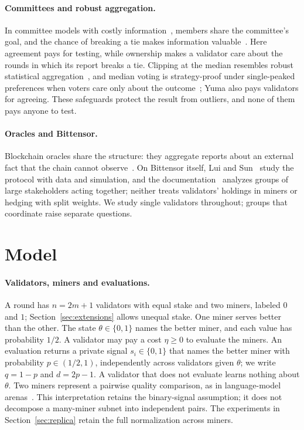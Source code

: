 \documentclass[sigconf,anonymous,review]{acmart}
\numberwithin{equation}{section}
\begin{document}
\paragraph{Committees and robust aggregation.} In committee models with
costly information~\cite{persico2004committee,gerardi2008information,
gershkov2009optimal}, members share the committee's goal, and the chance of
breaking a tie makes information valuable~\cite{austensmith1996information}.
Here agreement pays for testing, while ownership makes a validator care about
the rounds in which its report breaks a tie. Clipping at the median resembles
robust statistical aggregation~\cite{huber1964robust,yin2018byzantine}, and
median voting is strategy-proof under single-peaked preferences when voters
care only about the outcome~\cite{moulin1980strategy}; Yuma also pays
validators for agreeing. These safeguards protect the result from outliers,
and none of them pays anyone to test.

\paragraph{Oracles and Bittensor.} Blockchain oracles share the structure: they
aggregate reports about an external fact that the chain cannot
observe~\cite{eskandari2021sok}. On Bittensor itself, Lui and
Sun~\cite{lui2026bittensor} study the protocol with data and simulation, and the
documentation~\cite{bittensor2026yuma} analyzes groups of large stakeholders
acting together; neither treats validators' holdings in miners or hedging with
split weights. We
study single validators throughout; groups that coordinate raise separate
questions.

\section{Model}
\label{sec:model}

\paragraph{Validators, miners and evaluations.} A round has $n=2m+1$
validators with equal stake and two miners, labeled $0$ and $1$;
Section~\ref{sec:extensions} allows unequal stake. One miner serves better than
the other. The state $\theta\in\{0,1\}$ names the better miner, and each value
has probability $1/2$. A validator may pay a cost $\eta\ge0$ to evaluate the
miners. An evaluation returns a private signal $s_i\in\{0,1\}$ that names the
better miner with probability $p\in(1/2,1)$, independently across validators
given $\theta$; we write $q=1-p$ and $d=2p-1$. A validator that does not
evaluate learns nothing about $\theta$. Two miners represent a pairwise
quality comparison, as in language-model arenas~\cite{chiang2024chatbot}.
This interpretation retains the binary-signal assumption; it does not
decompose a many-miner subnet into independent pairs. The experiments in
Section~\ref{sec:replica} retain the full normalization across miners.
\end{document}

